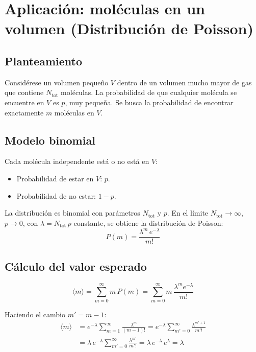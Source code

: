 \section{Aplicación: moléculas en un volumen (Distribución de Poisson)}

\subsection{Planteamiento}

Considérese un volumen pequeño $V$ dentro de un volumen mucho mayor de gas que contiene $N_{\text{tot}}$ moléculas. La probabilidad de que cualquier molécula se encuentre en $V$ es $p$, muy pequeña. Se busca la probabilidad de encontrar exactamente $m$ moléculas en $V$.

\figuraMoleculasVolumen

\subsection{Modelo binomial}

Cada molécula independente está o no está en $V$:
\begin{itemize}
    \item Probabilidad de estar en $V$: $p$.
    \item Probabilidad de no estar: $1 - p$.
\end{itemize}

La distribución es binomial con parámetros $N_{\text{tot}}$ y $p$. En el límite $N_{\text{tot}} \to \infty$, $p \to 0$, con $\lambda = N_{\text{tot}}\, p$ constante, se obtiene la distribución de Poisson:
$$
P(m) = \frac{\lambda^m\, e^{-\lambda}}{m!}
$$

\subsection{Cálculo del valor esperado}

$$
\langle m \rangle = \sum_{m=0}^{\infty} m\, P(m) = \sum_{m=0}^{\infty} m\, \frac{\lambda^m e^{-\lambda}}{m!}
$$

Haciendo el cambio $m' = m - 1$:
\begin{align*}
\langle m \rangle &= e^{-\lambda} \sum_{m=1}^{\infty} \frac{\lambda^m}{(m-1)!} = e^{-\lambda} \sum_{m'=0}^{\infty} \frac{\lambda^{m'+1}}{m'!} \\
&= \lambda\, e^{-\lambda} \sum_{m'=0}^{\infty} \frac{\lambda^{m'}}{m'!} = \lambda\, e^{-\lambda}\, e^{\lambda} = \lambda
\end{align*}

